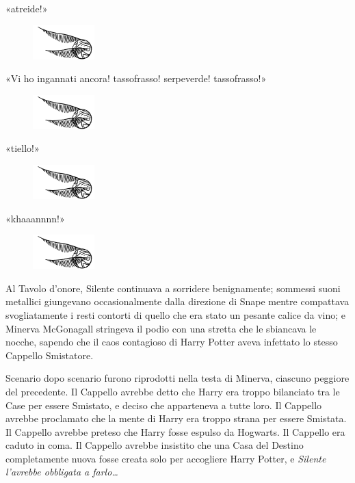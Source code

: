 «atreide!»

\begin{figure}[h!]
	\includegraphics[scale=0.4]{boccino.png}
	\centering
\end{figure}

«Vi ho ingannati ancora! tassofrasso! serpeverde! tassofrasso!»

\begin{figure}[h!]
	\includegraphics[scale=0.4]{boccino.png}
	\centering
\end{figure}

«tiello!»

\begin{figure}[h!]
	\includegraphics[scale=0.4]{boccino.png}
	\centering
\end{figure}

«khaaannnn!»

\begin{figure}[h!]
	\includegraphics[scale=0.4]{boccino.png}
	\centering
\end{figure}

Al Tavolo d’onore, Silente continuava a sorridere benignamente; sommessi suoni metallici giungevano occasionalmente dalla direzione di Snape mentre compattava svogliatamente i resti contorti di quello che era stato un pesante calice da vino; e Minerva McGonagall stringeva il podio con una stretta che le sbiancava le nocche, sapendo che il caos contagioso di Harry Potter aveva infettato lo stesso Cappello Smistatore.

Scenario dopo scenario furono riprodotti nella testa di Minerva, ciascuno peggiore del precedente. Il Cappello avrebbe detto che Harry era troppo bilanciato tra le Case per essere Smistato, e deciso che apparteneva a tutte loro. Il Cappello avrebbe proclamato che la mente di Harry era troppo strana per essere Smistata. Il Cappello avrebbe preteso che Harry fosse espulso da Hogwarts. Il Cappello era caduto in coma. Il Cappello avrebbe insistito che una Casa del Destino completamente nuova fosse creata solo per accogliere Harry Potter, e \textit{Silente l’avrebbe obbligata a farlo…}

